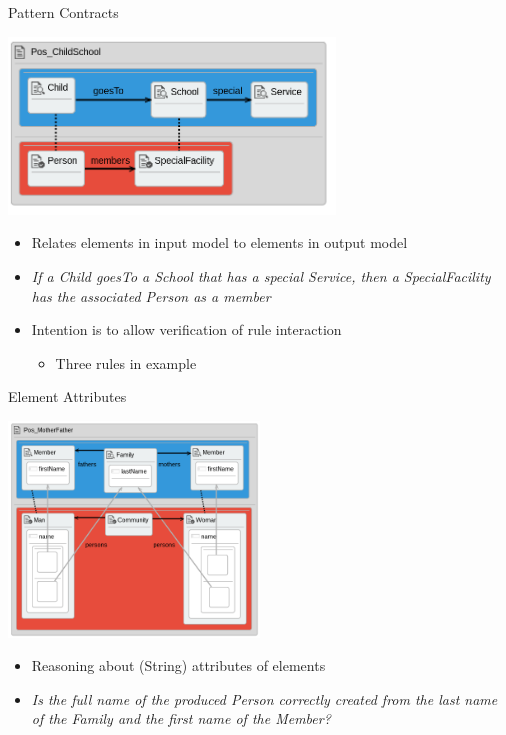 \documentclass[xcolor=dvipsnames, 12pt, handout]{beamer}
\begin{document}
\begin{frame}{Pattern Contracts}
\begin{center}
\includegraphics[width=0.65\textwidth]{figures/Pos_ChildSchool}
\end{center}
\begin{itemize}
\item Relates elements in input model to elements in output model
\item \textit{If a Child goesTo a School that has a special Service, then a SpecialFacility has the associated Person as a member}
\item Intention is to allow verification of rule interaction
\begin{itemize}
\item Three rules in example
\end{itemize}
\end{itemize}
\end{frame}


\begin{frame}{Element Attributes}
\begin{center}
\includegraphics[width=0.50\textwidth]{figures/Pos_MotherFather}
\end{center}
\pause
\begin{itemize}[<+->]
\item Reasoning about (String) attributes of elements
\item \textit{Is the full name of the produced Person correctly created from the last name of the Family and the first name of the Member?}
\end{itemize}
\end{frame}
\end{document}
